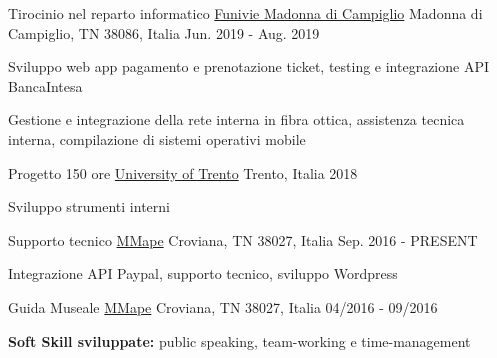 \begin{cventries}
\cventry
{Tirocinio nel reparto informatico} %
{\href{https://www.funiviecampiglio.it}{Funivie Madonna di Campiglio}} %
{Madonna di Campiglio, TN 38086, Italia} %
{Jun. 2019 - Aug. 2019} %
{
  \begin{cvitems} %
    \item {Sviluppo web app pagamento e prenotazione ticket, testing e integrazione API BancaIntesa}
    \item {Gestione e integrazione della rete interna in fibra ottica, assistenza tecnica interna, compilazione di sistemi operativi mobile}
  \end{cvitems}
  }

  \cventry
{Progetto 150 ore} %
{\href{https://www.unitn.it}{University of Trento}} %
{Trento, Italia} %
{2018} %
{
  \begin{cvitems} %
    \item {Sviluppo strumenti interni}
  \end{cvitems}
  }

\cventry
{Supporto tecnico} %
{\href{https://www.mmape.it}{MMape}} %
{Croviana, TN 38027, Italia} %
{Sep. 2016 - PRESENT} %
{
  \begin{cvitems} %
    \item {Integrazione API Paypal, supporto tecnico, sviluppo Wordpress}
  \end{cvitems}
}

\cventry
{Guida Museale} %
{\href{https://www.mmape.it}{MMape}} %
{Croviana, TN 38027, Italia} %
{04/2016 - 09/2016} %
{
  \begin{cvitems} %
    \item {\textbf{Soft Skill sviluppate:} public speaking, team-working e time-management}
  \end{cvitems}
}



\end{cventries}
